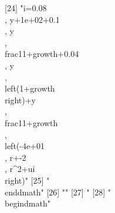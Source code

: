  [24] "{i}=0.08\\, {y}+1e+02+0.1\\, {y}\\, \\frac{1}{1+{growth}}+0.04\\, {y}\\, \\left(1+{growth}\\right)+{y}\\, \\frac{1}{1+{growth}}\\, \\left(-4e+01\\, {r}+-2\\, {r}^{2}+{ui}\\right)"                                                                                                                                                                                                                                                                                                          
 [25] "\\end{dmath}"                                                                                                                                                                                                                                                                                                                                                                                                                                                                                
 [26] ""                                                                                                                                                                                                                                                                                                                                                                                                                                                                                            
 [27] "%
 [28] "\\begin{dmath}"                                                                                                                                                                                                                                                                                                                                                                                                                                                                              

